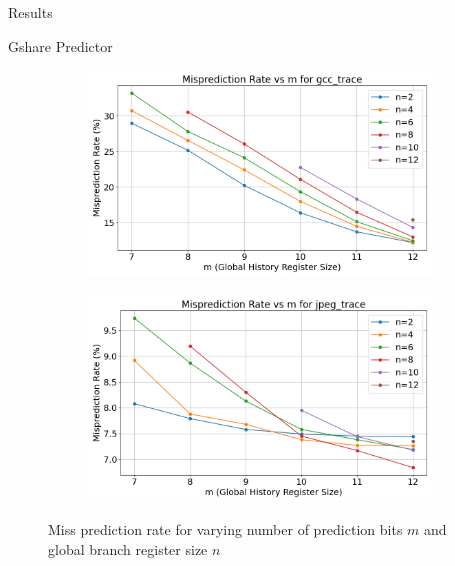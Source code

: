 \begin{section}{Results}
\begin{subsection}{Gshare Predictor}
        \begin{figure}[h] %
            \centering
            \begin{subfigure}[b]{0.45\textwidth}
                \centering
                \includegraphics[width=\textwidth]{figures/fig2/gcc_misprediction_plot.png} %
                \label{fig:pic1}
            \end{subfigure}
            \hfill
            \begin{subfigure}[b]{0.45\textwidth}
                \centering
                \includegraphics[width=\textwidth]{figures/fig2/jpeg_misprediction_plot.png} %
                \label{fig:pic2}
            \end{subfigure}
            \caption{Miss prediction rate for varying number of prediction bits $m$ and global branch register size $n$}
            \label{fig:twopictures}
        \end{figure}

    \end{subsection}

\end{section}
